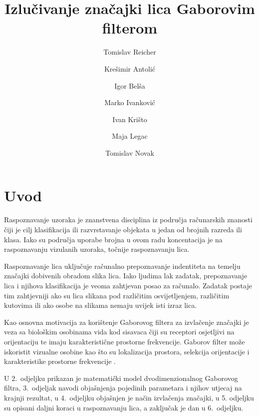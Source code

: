 \documentclass{article}
\begin{document}
\title{Izlučivanje značajki lica Gaborovim filterom}
\author{Tomislav Reicher \and Krešimir Antolić \and Igor Belša \and Marko Ivanković \and Ivan Krišto \and Maja Legac \and Tomislav Novak}

\maketitle

\tableofcontents

\section{Uvod}
Raspoznavanje uzoraka je znanstvena disciplina iz područja računarskih znanosti
čiji je cilj klasifikacija ili razvrstavanje objekata u jedan od brojnih razreda
ili klasa. Iako su područja uporabe brojna u ovom radu koncentacija je na
raspoznavanju vizulanih uzoraka, točnije raspoznavanju lica.

Raspoznavanje lica uključuje računalno prepoznavanje indentiteta na temelju
značajki dobivenih obradom slika lica. Iako ljudima lak zadatak, prepoznavanje
lica i njihova klasifikacija je veoma zahtjevan posao za računalo. Zadatak
postaje tim zahtjevniji ako su lica slikana pod različitim osvijetljenjem,
različitim kutovima ili ako osobe na slikama nemaju uvijek isti izraz lica.

Kao osnovna motivacija za korištenje Gaborovog filtera za izvlačenje značajki je
veza sa biološkim osobinama vida kod sisavaca čiji su receptori osjetljivi na
orijentaciju te imaju karakteristične prostorne frekvencije. Gaborov filter može
iskoristit vizualne osobine kao što su lokalizacija prostora, selekcija
orijentacije i karakteristike prostorne frekvencije
\citep{bhuiyan2007onfacerecognition}\nocite{daugman1985uncertainty}.

U 2.~odjeljku prikazan je matematički model dvodimenzionalnog Gaborovog filtra,
3.~odjeljak navodi objašnjenja pojedinih parametara i njihov utjecaj na krajnji rezultat, 
u 4.~odjeljku objašnjen je način izvlačenja značajki, 
u 5. odjeljku su opisani daljni koraci u raspoznavanju lica, a zaključak je dan u 6.~odjeljku.
\end{document}
